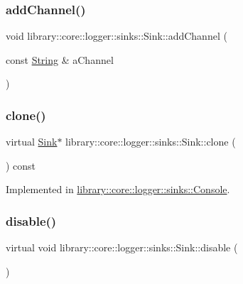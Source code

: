 \subsubsection{\texorpdfstring{addChannel()}{addChannel()}}
{\footnotesize\ttfamily void library\+::core\+::logger\+::sinks\+::\+Sink\+::add\+Channel (\begin{DoxyParamCaption}\item[{const \mbox{\hyperlink{classlibrary_1_1core_1_1types_1_1_string}{String}} \&}]{a\+Channel }\end{DoxyParamCaption})}

\mbox{\label{classlibrary_1_1core_1_1logger_1_1sinks_1_1_sink_a00ba941947d903825f4922694e0961dd}} 
\subsubsection{\texorpdfstring{clone()}{clone()}}
{\footnotesize\ttfamily virtual \mbox{\hyperlink{classlibrary_1_1core_1_1logger_1_1sinks_1_1_sink}{Sink}}$\ast$ library\+::core\+::logger\+::sinks\+::\+Sink\+::clone (\begin{DoxyParamCaption}{ }\end{DoxyParamCaption}) const\hspace{0.3cm}{\ttfamily [pure virtual]}}



Implemented in \mbox{\hyperlink{classlibrary_1_1core_1_1logger_1_1sinks_1_1_console_ac5c80193b0832f760a7447e7abc7d468}{library\+::core\+::logger\+::sinks\+::\+Console}}.

\mbox{\label{classlibrary_1_1core_1_1logger_1_1sinks_1_1_sink_a3ab28f7a964d138fc9d080f026bb4143}} 
\subsubsection{\texorpdfstring{disable()}{disable()}}
{\footnotesize\ttfamily virtual void library\+::core\+::logger\+::sinks\+::\+Sink\+::disable (\begin{DoxyParamCaption}{ }\end{DoxyParamCaption})\hspace{0.3cm}{\ttfamily [pure virtual]}}



